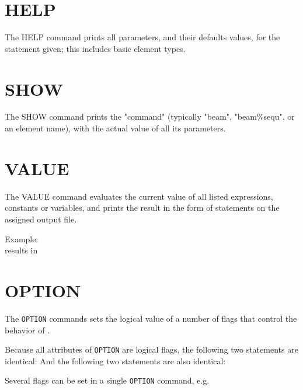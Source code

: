 \section{HELP}
\label{sec:help}
The HELP command prints all parameters, and their defaults values, for
the statement given; this includes basic element types.

\section{SHOW}
\label{sec:show}
The SHOW command prints the "command" (typically "beam", "beam\%sequ",
or an element name), with the actual value of all its parameters.  

\section{VALUE}
\label{sec:value}
The VALUE command evaluates the current value of all listed expressions,
constants or variables, and prints the result in the form of \madx
statements on the assigned output file. 

Example: \\
results in 

\section{OPTION}
\label{sec:option}

The {\tt OPTION} commands sets the logical value of a number of flags
that control the behavior of \madx.


Because all attributes of {\tt OPTION} are logical flags, the
following two statements are identical:
And the following two statements are also identical:

Several flags can be set in a single {\tt OPTION} command, e.g.


